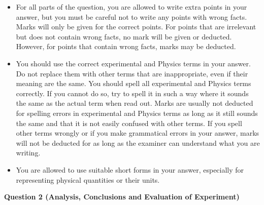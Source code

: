 \documentclass{article}
\begin{document}
\begin{itemize}
    \item For all parts of the question, you are allowed to write extra points in your answer, but you must be careful not to write any points with wrong facts. Marks will only be given for the correct points. For points that are irrelevant but does not contain wrong facts, no mark will be given or deducted. However, for points that contain wrong facts, marks may be deducted.
    \item You should use the correct experimental and Physics terms in your answer. Do not replace them with other terms that are inappropriate, even if their meaning are the same. You should spell all experimental and Physics terms correctly. If you cannot do so, try to spell it in such a way where it sounds the same as the actual term when read out. Marks are usually not deducted for spelling errors in experimental and Physics terms as long as it still sounds the same and that it is not easily confused with other terms. If you spell other terms wrongly or if you make grammatical errors in your answer, marks will not be deducted for as long as the examiner can understand what you are writing.
    \item 	You are allowed to use suitable short forms in your answer, especially for representing physical quantities or their units.

\end{itemize}
\newpage
\begin{flushleft}
\textbf{Question 2 (Analysis, Conclusions and Evaluation of Experiment)}\\

\end{flushleft}
\end{document}
